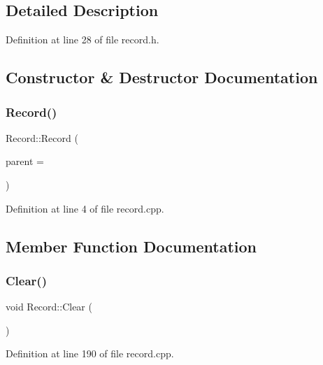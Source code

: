 \subsection{Detailed Description}


Definition at line 28 of file record.\+h.



\subsection{Constructor \& Destructor Documentation}
\mbox{\label{class_record_af85c9f8ff0abca5ee43b4a024557f38a}} 
\subsubsection{\texorpdfstring{Record()}{Record()}}
{\footnotesize\ttfamily Record\+::\+Record (\begin{DoxyParamCaption}\item[{Q\+Widget $\ast$}]{parent = {} }\end{DoxyParamCaption})\hspace{0.3cm}{\ttfamily [explicit]}}



Definition at line 4 of file record.\+cpp.



\subsection{Member Function Documentation}
\mbox{\label{class_record_af70466cb248483ed2a32fb5a48a83cac}} 
\subsubsection{\texorpdfstring{Clear()}{Clear()}}
{\footnotesize\ttfamily void Record\+::\+Clear (\begin{DoxyParamCaption}{ }\end{DoxyParamCaption})}



Definition at line 190 of file record.\+cpp.

\mbox{\label{class_record_ad33ee61f2d53795e3090426aa3ba6af0}} 
